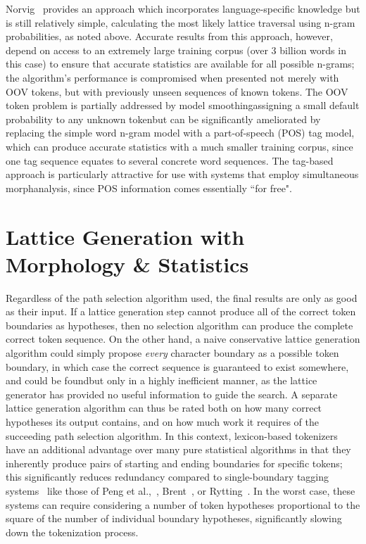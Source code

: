 Norvig~\cite{norvig14} provides an approach which incorporates language-specific knowledge but is still relatively simple, calculating the most likely lattice traversal using n-gram probabilities, as noted above. Accurate results from this approach, however, depend on access to an extremely large training corpus (over 3 billion words in this case) to ensure that accurate statistics are available for all possible n-grams; the algorithm's performance is compromised when presented not merely with OOV tokens, but with previously unseen sequences of known tokens. The OOV token problem is partially addressed by model smoothing\textemdash assigning a small default probability to any unknown token\textemdash but can be significantly ameliorated by replacing the simple word n-gram model with a part-of-speech (POS) tag model, which can produce accurate statistics with a much smaller training corpus, since one tag sequence equates to several concrete word sequences. The tag-based approach is particularly attractive for use with systems that employ simultaneous morphanalysis, since POS information comes essentially ``for free".

\section{Lattice Generation with Morphology \& Statistics}

Regardless of the path selection algorithm used, the final results are only as good as their input. If a lattice generation step cannot produce all of the correct token boundaries as hypotheses, then no selection algorithm can produce the complete correct token sequence. On the other hand, a na\:ive conservative lattice generation algorithm could simply propose \textit{every} character boundary as a possible token boundary, in which case the correct sequence is guaranteed to exist somewhere, and could be found\textemdash but only in a highly inefficient manner, as the lattice generator has provided no useful information to guide the search. A separate lattice generation algorithm can thus be rated both on how many correct hypotheses its output contains, and on how much work it requires of the succeeding path selection algorithm. In this context, lexicon-based tokenizers have an additional advantage over many pure statistical algorithms in that they inherently produce pairs of starting and ending boundaries for specific tokens; this significantly reduces redundancy compared to single-boundary tagging systems~\cite{kudo04} like those of Peng et al.,~\cite{peng04}, Brent~\cite{brent99}, or Rytting~\cite{rytting04}. In the worst case, these systems can require considering a number of token hypotheses proportional to the square of the number of individual boundary hypotheses, significantly slowing down the tokenization process.

